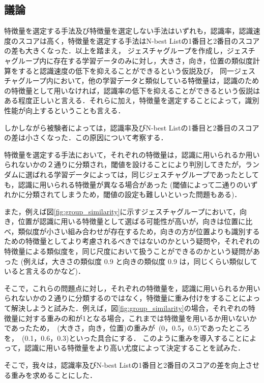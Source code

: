\newpage
\subsection{議論}

特徴量を選定する手法及び特徴量を選定しない手法はいずれも，認識率，認識速度のスコアは高く，特徴量を選定する手法はN-best Listの1番目と2番目のスコアの差も大きくなった．以上を踏まえ，
ジェスチャグループを作成し，ジェスチャグループ内に存在する学習データのみに対し，大きさ，向き，位置の類似度計算をすると認識速度の低下を抑えることができるという仮説及び，
同一ジェスチャグループ内において，他の学習データと類似している特徴量は，認識のための特徴量として用いなければ，認識率の低下を抑えることができるという仮説はある程度正しいと言える．それらに加え，特徴量を選定することによって，識別性能が向上するということも言える．

しかしながら被験者によっては，認識率及びN-best Listの1番目と2番目のスコアの差は小さくなった．この原因について考察する．

特徴量を選定する手法において，それぞれの特徴量は，認識に用いられるか用いられないかの２通りに分類され，閾値を設けることにより判別してきたが，ランダムに選ばれる学習データによっては，同じジェスチャグループであったとしても，認識に用いられる特徴量が異なる場合があった (閾値によって二通りのいずれかに分類されてしまうため，閾値の設定も難しいといった問題もある)．

また，例えば図\ref{fig:group_similarity}に示すジェスチャグループにおいて，向き，位置が認識に用いる特徴量として選ばる可能性が高いが，向きは位置に比べ，類似度が小さい組み合わせが存在するため，向きの方が位置よりも識別するための特徴量としてより考慮されるべきではないのかという疑問や，それぞれの特徴量による類似度を，同じ尺度において扱うことができるのかという疑問があった (例えば，大きさの類似度 0.9 と向きの類似度 0.9 は，同じくらい類似していると言えるのかなど)．

そこで，これらの問題点に対し，それぞれの特徴量を，認識に用いられるか用いられないかの２通りに分類するのではなく，特徴量に重み付けをすることによって解決しようと試みた．例えば，図\ref{fig:group_similarity}の場合，それぞれの特徴量に対する重みの和が1となる場合，これまでは特徴量を用いるか用いないかであったため，~(大きさ，向き，位置)の重みが~(0，0.5，0.5)であったところを，~(0.1，0.6，0.3)といった具合にする．
このように重みを導入することによって，認識に用いる特徴量をより高い尤度によって決定することを試みた．

そこで，我々は，認識率及びN-best Listの1番目と2番目のスコアの差を向上させる重みを求めることにした．

